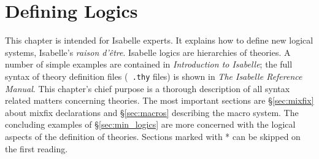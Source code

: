 \newcommand{\rmindex}[1]{{#1}\index{#1}\@}
\newcommand{\mtt}[1]{\mbox{\tt #1}}
\newcommand{\ttfct}[1]{\mathop{\mtt{#1}}\nolimits}
\newcommand{\ttrel}[1]{\mathrel{\mtt{#1}}}
\newcommand{\Constant}{\ttfct{Constant}}
\newcommand{\Variable}{\ttfct{Variable}}
\newcommand{\Appl}[1]{\ttfct{Appl}\mathopen{\mtt[}#1\mathclose{\mtt]}}



\chapter{Defining Logics} \label{Defining-Logics}

This chapter is intended for Isabelle experts. It explains how to define new
logical systems, Isabelle's {\em raison d'\^etre}. Isabelle logics are
hierarchies of theories. A number of simple examples are contained in {\em
Introduction to Isabelle}; the full syntax of theory definition files ({\tt
.thy} files) is shown in {\em The Isabelle Reference Manual}. This chapter's
chief purpose is a thorough description of all syntax related matters
concerning theories. The most important sections are \S\ref{sec:mixfix} about
mixfix declarations and \S\ref{sec:macros} describing the macro system. The
concluding examples of \S\ref{sec:min_logics} are more concerned with the
logical aspects of the definition of theories. Sections marked with * can be
skipped on the first reading.


%



